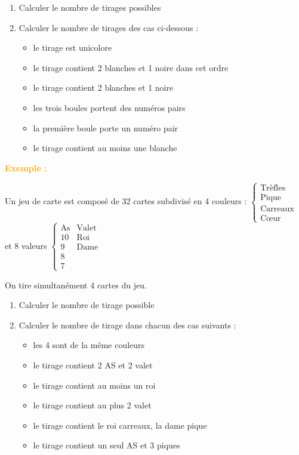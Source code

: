 \documentclass[12pt,a4paper]{article}
\newcounter{exemple}
\newcommand{\exemple}{
\refstepcounter{exemple}
\textbf{\textcolor{orange}{Exemple \theexemple : }}
}
\begin{document}
\begin{enumerate}[label=\Roman*., font=\bfseries\color{red}]
\begin{enumerate}
\begin{enumerate}
    \item Calculer le nombre de tirages possibles
    \item Calculer le nombre de tirages des cas ci-dessous :
    \begin{itemize}
        \item[A :] le tirage est unicolore
        \item[B :] le tirage contient 2 blanches et 1 noire dans cet ordre
        \item[C :] le tirage contient 2 blanches et 1 noire
        \item[D :] les trois boules portent des numéros pairs
        \item[E :] la première boule porte un numéro pair
        \item[F :] le tirage contient au moins une blanche
    \end{itemize}
\end{enumerate}

\exemple

Un jeu de carte est composé de 32 cartes subdivisé en 4 couleurs :
$\begin{cases} \text{Trèfles} \\ \text{Pique} \\ \text{Carreaux} \\ \text{Cœur} \end{cases}$ 
et 8 valeurs $\begin{cases} \text{As} & \text{Valet} \\ 10 & \text{Roi} \\ 9 & \text{Dame} \\ 8 & \\ 7 & \end{cases}$

On tire simultanément 4 cartes du jeu.

\begin{enumerate}
    \item Calculer le nombre de tirage possible
    \item Calculer le nombre de tirage dans chacun des cas suivants :
    \begin{itemize}
        \item[A :] les 4 sont de la même couleurs
        \item[B :] le tirage contient 2 AS et 2 valet
        \item[C :] le tirage contient au moins un roi
        \item[D :] le tirage contient au plus 2 valet
        \item[E :] le tirage contient le roi carreaux, la dame pique
        \item[F :] le tirage contient un seul AS et 3 piques
    \end{itemize}
\end{enumerate}


\end{enumerate}
\end{enumerate}
\end{document}

